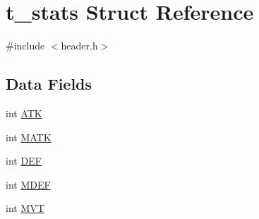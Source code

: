 \hypertarget{structt__stats}{\section{t\-\_\-stats Struct Reference}
\label{structt__stats}
}


{\ttfamily \#include $<$header.\-h$>$}

\subsection*{Data Fields}
\begin{DoxyCompactItemize}
\item 
int \hyperlink{structt__stats_a3b3918526788ae6b163c41dc25326396}{A\-T\-K}
\item 
int \hyperlink{structt__stats_ae183b98dc9aca9905f531bfd4dd51a1c}{M\-A\-T\-K}
\item 
int \hyperlink{structt__stats_a30707041436614e9e3759b7bf533b201}{D\-E\-F}
\item 
int \hyperlink{structt__stats_a92ab6d75a95ed209b7875314f53fb555}{M\-D\-E\-F}
\item 
int \hyperlink{structt__stats_a397f7940443939415a50f324dc5f56f9}{M\-V\-T}
\end{DoxyCompactItemize}



